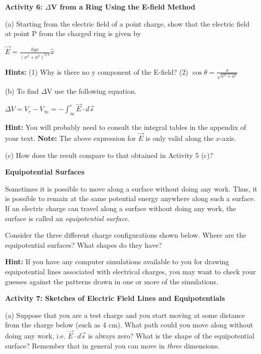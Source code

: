 \textbf{Activity 6: \( \Delta  \)V from a Ring Using the E-field
Method}

(a) Starting from the electric field of a point charge, show that
the electric field at point P from the charged ring is given by

{\centering \( \overrightarrow{E}=\frac{kqx}{(x^{2}+a^{2})^{3/2}}\hat{x} \)\par}

\textbf{Hints:} (1) Why is there no y component of the E-field? (2)
\( \cos \theta =\frac{x}{\sqrt{x^{2}+a^{2}}} \)
\vspace{30mm}

(b) To find \( \Delta  \)V use the following equation.

{\centering \( \Delta V=V_{r}-V_{\infty }=-\int ^{r}_{\infty }\overrightarrow{E}\cdot d\overrightarrow{s} \)\par}
\textbf{Hint:} You will probably need to consult the integral tables in the appendix of your text.
\textbf{Note:} The above expression for $\overrightarrow{E}$ is only valid along the $x$-axis.
\vspace{30mm}

(c) How does the result compare to that obtained in Activity 5 (c)?
\vspace{30mm}

\textbf{Equipotential Surfaces}

Sometimes it is possible to move along a surface without doing any
work. Thus, it is possible to remain at the same potential energy
anywhere along such a surface. If an electric charge can travel along
a surface without doing any work, the surface is called an \emph{equipotential
surface}.

Consider the three different charge configurations shown below. Where
are the equipotential surfaces? What shapes do they have?

\textbf{Hint:} If you have any computer simulations available to you
for drawing equipotential lines associated with electrical charges,
you may want to check your guesses against the patterns drawn in one
or more of the simulations.

\textbf{Activity 7: Sketches of Electric Field Lines and Equipotentials}

(a) Suppose that you are a test charge and you start moving at some
distance from the charge below (such as 4 cm). What path could you
move along without doing any work, i.e. \( \overrightarrow{E}\cdot d\overrightarrow{s} \)
is always zero? What is the shape of the equipotential surface? Remember
that in general you can move in \emph{three} dimensions.

